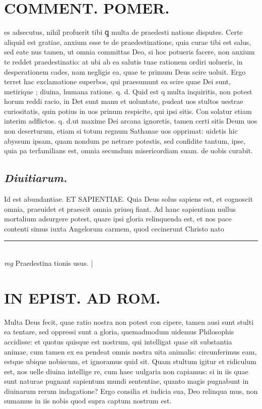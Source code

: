 \documentclass{article}
\begin{document}
\begin{pages}
\section*{COMMENT. POMER.  }\pstart es adsecutus, nihil profuerit tibi ꝗ multa de praedesti natione disputes. Certe aliquid est gratiae, anxium esse te de praedestinatione, quia curae tibi est salus, sed eate nus tamen, ut omnia committas Deo, si hoc potueris facere, non anxium te reddet praedestinatio: at ubi ab ea salutis tuae rationem ordiri uolueris, in desperationem cades, nam negligis ea, quae te primum Deus scire uoluit. Ergo terret hac exclamatione superbos, qui praesumunt ea scire quae Dei sunt, metirique ; diuina, humana ratione. q. d. Quid est q multa inquiritis, non potest horum reddi racio, in Det sunt manu et uoluntate, pudeat uos stultos uestrae curiositatis, quin potius in uos prinum respicite, qui ipsi sitis. Con solatur etiam interim adflictos. q. d.ut maxime Dei arcana ignoretis, tamen certi sitis Deum uos non deserturum, etiam si totum regnum Sathanae uos opprimat: uidetis hic abyssum ipsam, quam nondum pe netrare potestis, sed confidite tantum, ipse, quia pa terfamilians est, omnia secundum misericordiam suam. de uobis curabit.  \pend
{}
{}
\subsection*{\textit{Diuitiarum. }}\pstart Id est abundantiae. ET SAPIENTIAE.  Quia Deus solus sapiens est, et cognoscit omnia, praeuidet et praescit omnia priusq fiant. Ad hanc sapientiam nullus mortalium adsurgere potest, quare ipsi gloria relinquenda est, et nos pace contenti simus iuxta Angelorum carmem, quod cecinerunt Christo nato  \pend
\vspace{0.5cm}\noindent
\vspace{0.2cm}\rule{1cm}{0.2pt}\\ 
\hspace{0.2cm}\textit{mg}
\footnotesize Praedestina tionis usus.  
\normalsize| 
\section*{IN EPIST. AD ROM.  }
\marginpar{[ p.u7 ]}\pstart Multa Deus fecit, quae ratio nostra non potest con cipere, tamen ausi sunt stulti ea tentare, sed oppressi sunt a gloria, quemadmodum uidemus Philosophis accidisse: et quotus quisque est nostrum, qui intelligat quae sit substantia animae, cum tamen ex ea pendeat omnis nostra uita animalis: circunferimus eam, estque  ubique nobiscum, et ignoramus quid sit. Quam stultum igitur et ridiculum est, nos uelle diuina intellige re, cum haec uulgaria non capiamus: si in iis quae sunt naturae pugnant sapientum mundi sententiae, quanto magis pugnabunt in diuinarum rerum indagatione? Ergo consilia et iudicia sua, Deo relinqua mus, non sumamus in iis nobis quod supra captum nostrum est.   \pend
{}
{}

\end{pages}
\end{document}
